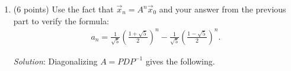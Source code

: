\documentclass{article}
\begin{document}
\begin{enumerate}
        Therefore, by the Diagonalization Theorem in \textcite[Theorem~5.5, p.~291]{LayEtAl2020LinearAlgebraAndItsApplications}, we have diagonalized $A$ and can write it as $A = PDP^{-1}$, where $D$ is a diagonal matrix similar to $A$, and $P$ is an invertible matrix.
        \pagebreak
  \item (6 points) Use the fact that $\vec{x}_n = A^n \vec{x}_0$ and your answer from the previous part to verify the formula:
        \begin{align*}
          a_n = \frac{1}{\sqrt{5}} \left( \frac{1 + \sqrt{5}}{2} \right)^n - \frac{1}{\sqrt{5}} \left( \frac{1 - \sqrt{5}}{2} \right)^n.
        \end{align*}

        \emph{Solution}: Diagonalizing $A=PDP^{-1}$ gives the following.


\end{enumerate}
\end{document}

